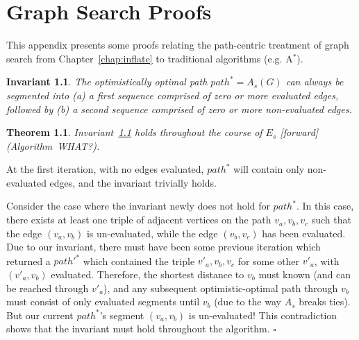 \documentclass{report}
\newtheorem{invariant}{Invariant}
\newtheorem{theorem}{Theorem}
\newenvironment{proof}[1][Proof]{\begin{trivlist}
   \item[\hskip \labelsep {\bfseries #1}]}{\hfill$\square$\end{trivlist}}
\begin{document}
{\small


}

\appendix
\chapter{Graph Search Proofs}
\label{appendix:gs-proofs}

This appendix presents some proofs relating the path-centric treatment
of graph search from Chapter~\ref{chap:inflate}
to traditional algorithms (e.g. A$^*$).

\begin{invariant}
The optimistically optimal path $path^* = A_s(G)$ can always be
segmented into
(a) a first sequence comprised of zero or more evaluated edges,
followed by
(b) a second sequence comprised of zero or more non-evaluated edges.
\label{inv:path-segmentation}
\end{invariant}

\begin{theorem}
Invariant~\ref{inv:path-segmentation} holds throughout the course of
$E_s$ [forward] (Algorithm~WHAT?).
\label{thm:seg-fwd}
\end{theorem}

\begin{proof}
At the first iteration, with no edges evaluated,
$path^*$ will contain only non-evaluated edges,
and the invariant trivially holds.

Consider the case where the invariant newly does not hold for $path^*$.
In this case, there exists at least one triple of adjacent vertices
on the path $v_a, v_b, v_c$
such that the edge $(v_a, v_b)$ is un-evaluated,
while the edge $(v_b, v_c)$ has been evaluated.
Due to our invariant,
there must have been some previous iteration which returned a
$path'^*$ which contained the triple
$v'_a, v_b, v_c$ for some other $v'_a$,
with $(v'_a, v_b)$ evaluated.
Therefore, the shortest distance to $v_b$ must known (and can be
reached through $v'_a$),
and any subsequent optimistic-optimal path through $v_b$
must consist of only evaluated segments until $v_b$
(due to the way $A_s$ breaks ties).
But our current $path^*$'s segment $(v_a, v_b)$ is un-evaluated!
This contradiction shows that the invariant must hold throughout the
algorithm.
\end{proof}
\end{document}
